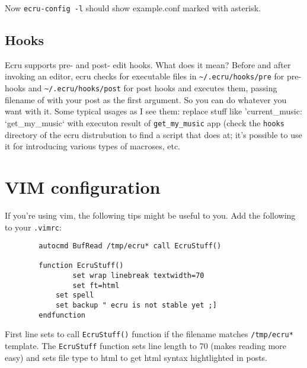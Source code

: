 \documentclass{article}
\begin{document}
	Now {\tt ecru-config -l} should show example.conf marked with asterisk.
      \subsection{Hooks}
        Ecru supports pre- and post- edit hooks. What does it mean? Before and after invoking an editor,
	ecru checks for executable files in {\tt \verb+~+/.ecru/hooks/pre} for pre- hooks and
	{\tt \verb+~+/.ecru/hooks/post} for post hooks and executes them, passing filename of with your
	post as the first argument. So you can do whatever you want with it. Some typical usages as
	I see them: replace stuff like 'current_music: `get_my_music` with executon result of 
	{\tt get_my_music} app (check the {\tt hooks} directory of the ecru distrubution to find
	a script that does at; it's possible to use it for introducing various types of macroses, etc.
     \section{VIM configuration}
        If you're using vim, the following tips might be useful to you. Add the following to your {\tt .vimrc}:
        \begin{verbatim}
		autocmd BufRead /tmp/ecru* call EcruStuff()

		function EcruStuff()
		        set wrap linebreak textwidth=70
		        set ft=html
			set spell
			set backup " ecru is not stable yet ;]
		endfunction
	\end{verbatim}

	First line sets to call {\tt EcruStuff()} function if the filename matches {\tt /tmp/ecru*} template.
	The {\tt EcruStuff} function sets line length to 70 (makes reading more easy) and sets file type to
	html to get html syntax hightlighted in posts.
\end{document}
